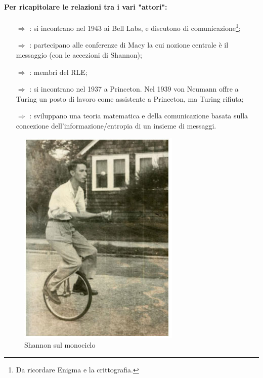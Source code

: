 \subsubsection{}

\paragraph{Per ricapitolare le relazioni tra i vari "attori":}

\begin{itemize}
    \item [$\Rightarrow$] : si incontrano nel 1943 ai Bell Labs, e discutono di comunicazione\footnote{Da ricordare Enigma e la crittografia.};
    \item [$\Rightarrow$] : partecipano alle conferenze di Macy la cui nozione centrale è il messaggio (con le accezioni di Shannon);
    \item [$\Rightarrow$] : membri del RLE;
    \item [$\Rightarrow$] : si incontrano nel 1937 a Princeton. Nel 1939 von Neumann offre a Turing un posto di lavoro come assistente a Princeton, ma Turing rifiuta;
    \item [$\Rightarrow$] : sviluppano una teoria matematica e della comunicazione basata sulla concezione dell'informazione/entropia di un insieme di messaggi.
\end{itemize}


\begin{figure}[h]
    \centering
    \includegraphics[scale=0.30]{images/Shannon monocycle.jpg}
    \caption{Shannon sul monociclo}
\end{figure}

